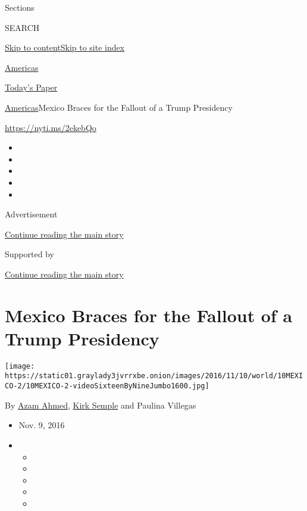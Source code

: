Sections

SEARCH

\protect\hyperlink{site-content}{Skip to
content}\protect\hyperlink{site-index}{Skip to site index}

\href{https://www.nytimes3xbfgragh.onion/section/world/americas}{Americas}

\href{https://myaccount.nytimes3xbfgragh.onion/auth/login?response_type=cookie\&client_id=vi}{}

\href{https://www.nytimes3xbfgragh.onion/section/todayspaper}{Today's
Paper}

\href{/section/world/americas}{Americas}\textbar{}Mexico Braces for the
Fallout of a Trump Presidency

\url{https://nyti.ms/2ekebQo}

\begin{itemize}
\item
\item
\item
\item
\item
\end{itemize}

Advertisement

\protect\hyperlink{after-top}{Continue reading the main story}

Supported by

\protect\hyperlink{after-sponsor}{Continue reading the main story}

\hypertarget{mexico-braces-for-the-fallout-of-a-trump-presidency}{%
\section{Mexico Braces for the Fallout of a Trump
Presidency}\label{mexico-braces-for-the-fallout-of-a-trump-presidency}}

\texttt{[image: https://static01.graylady3jvrrxbe.onion/images/2016/11/10/world/10MEXICO-2/10MEXICO-2-videoSixteenByNineJumbo1600.jpg]}

By \href{http://www.nytimes3xbfgragh.onion/by/azam-ahmed}{Azam Ahmed},
\href{http://www.nytimes3xbfgragh.onion/by/kirk-semple}{Kirk Semple} and
Paulina Villegas

\begin{itemize}
\item
  Nov. 9, 2016
\item
  \begin{itemize}
  \item
  \item
  \item
  \item
  \item
  \end{itemize}
\end{itemize}

